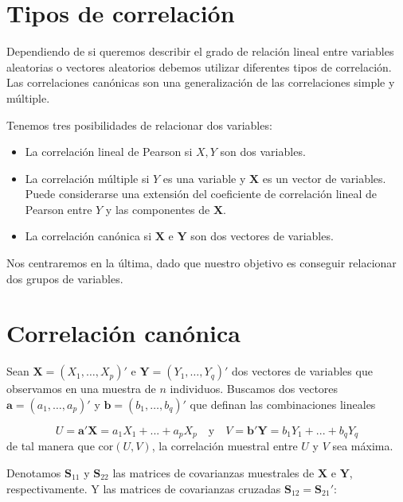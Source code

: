 \documentclass[tfg,cienciasbased,lot,lof,covers,final,overleaf,nocopyright]{tfgtfmthesisuam}
\begin{document}
\section{Tipos de correlación}
Dependiendo de si queremos describir el grado de relación lineal entre variables aleatorias o vectores aleatorios debemos utilizar diferentes tipos de correlación. Las correlaciones canónicas son una generalización de las correlaciones simple y múltiple.

Tenemos tres posibilidades de relacionar dos variables:

\begin{itemize}
    \item La correlación lineal de Pearson si $X, Y$ son dos variables.
    \item La correlación múltiple si $Y$ es una variable y $\mathbf{X}$ es un vector de variables. Puede considerarse una extensión del coeficiente de correlación lineal de Pearson entre $Y$ y las componentes de $\mathbf{X}$.
    \item La correlación canónica si $\mathbf{X}$ e $\mathbf{Y}$ son dos vectores de variables.
\end{itemize}
Nos centraremos en la última, dado que nuestro objetivo es conseguir relacionar dos grupos de variables.
\section{Correlación canónica}

Sean $\mathbf{X} = (X_1, \ldots, X_p)'$ e $\mathbf{Y} = (Y_1, \ldots, Y_q)'$ dos vectores de variables que observamos en una muestra de $n$ individuos. Buscamos dos vectores $\mathbf{a} = (a_1, \ldots, a_p)'$ y $\mathbf{b} = (b_1, \ldots, b_q)'$ que definan las combinaciones lineales

\begin{equation*}
    U = \mathbf{a'X} = a_1 X_1 + ... + a_p X_p \quad \mbox{y} \quad V = \mathbf{b'Y} = b_1 Y_1 + ... + b_q Y_q 
\end{equation*}
de tal manera que $\mbox{cor}(U, V)$, la correlación muestral entre $U$ y $V$ sea máxima.

Denotamos $\mathbf{S}_{11}$ y $\mathbf{S}_{22}$ las matrices de covarianzas muestrales de $\mathbf{X}$ e $\mathbf{Y}$, respectivamente. Y las matrices de covarianzas cruzadas $\mathbf{S}_{12} = \mathbf{S}_{21}'$:
\end{document}
